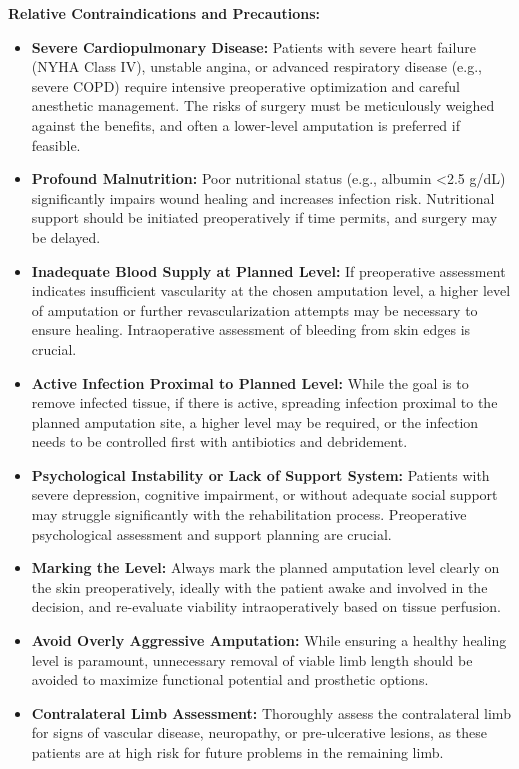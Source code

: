 \textbf{Relative Contraindications and Precautions:}
\begin{itemize}
  \item \textbf{Severe Cardiopulmonary Disease:} Patients with severe heart failure (NYHA Class IV), unstable angina, or advanced respiratory disease (e.g., severe COPD) require intensive preoperative optimization and careful anesthetic management. The risks of surgery must be meticulously weighed against the benefits, and often a lower-level amputation is preferred if feasible.
  \item \textbf{Profound Malnutrition:} Poor nutritional status (e.g., albumin <2.5 g/dL) significantly impairs wound healing and increases infection risk. Nutritional support should be initiated preoperatively if time permits, and surgery may be delayed.
  \item \textbf{Inadequate Blood Supply at Planned Level:} If preoperative assessment indicates insufficient vascularity at the chosen amputation level, a higher level of amputation or further revascularization attempts may be necessary to ensure healing. Intraoperative assessment of bleeding from skin edges is crucial.
  \item \textbf{Active Infection Proximal to Planned Level:} While the goal is to remove infected tissue, if there is active, spreading infection proximal to the planned amputation site, a higher level may be required, or the infection needs to be controlled first with antibiotics and debridement.
  \item \textbf{Psychological Instability or Lack of Support System:} Patients with severe depression, cognitive impairment, or without adequate social support may struggle significantly with the rehabilitation process. Preoperative psychological assessment and support planning are crucial.
  \item \textbf{Marking the Level:} Always mark the planned amputation level clearly on the skin preoperatively, ideally with the patient awake and involved in the decision, and re-evaluate viability intraoperatively based on tissue perfusion.
  \item \textbf{Avoid Overly Aggressive Amputation:} While ensuring a healthy healing level is paramount, unnecessary removal of viable limb length should be avoided to maximize functional potential and prosthetic options.
  \item \textbf{Contralateral Limb Assessment:} Thoroughly assess the contralateral limb for signs of vascular disease, neuropathy, or pre-ulcerative lesions, as these patients are at high risk for future problems in the remaining limb.
\end{itemize}

